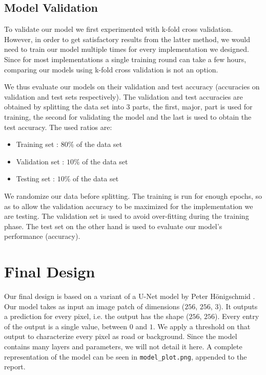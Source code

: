 \documentclass[10pt,conference,compsocconf]{IEEEtran}
\begin{document}
\subsection{Model Validation} 
\label{ssec:model_validation}

To validate our model we first experimented with k-fold cross validation. However, in order to get satisfactory results from the latter method, we would need to train our model multiple times for every implementation we designed. Since for most implementations a single training round can take a few hours, comparing our models using k-fold cross validation is not an option.

We thus evaluate our models on their validation and test accuracy (accuracies on validation and test sets respectively). The validation and test accuracies are obtained by splitting the data set into 3 parts, the first, major, part is used for training, the second for validating the model and the last is used to obtain the test accuracy. The used ratios are: 
\begin{itemize}
	\item Training set : $80\%$ of the data set
	\item Validation set : $10\%$ of the data set
	\item Testing set : $10\%$ of the data set
\end{itemize}
We randomize our data before splitting. The training is run for enough epochs, so as to allow the validation accuracy to be maximized for the implementation we are testing. The validation set is used to avoid over-fitting during the training phase. The test set on the other hand is used to evaluate our model's performance (accuracy).

\section{Final Design}
\label{sec:final}

Our final design is based on a variant of a U-Net model by Peter Hönigschmid \cite{unet}. Our model takes as input an image patch of dimensions ($256$, $256$, $3$). It outputs a prediction for every pixel, i.e. the output has the shape ($256$, $256$). Every entry of the output is a single value, between $0$ and $1$. We apply a threshold on that output to characterize every pixel as road or background. Since the model contains many layers and parameters, we will not detail it here. A complete representation of the model can be seen in \texttt{model\_plot.png}, appended to the report. 
\end{document}
